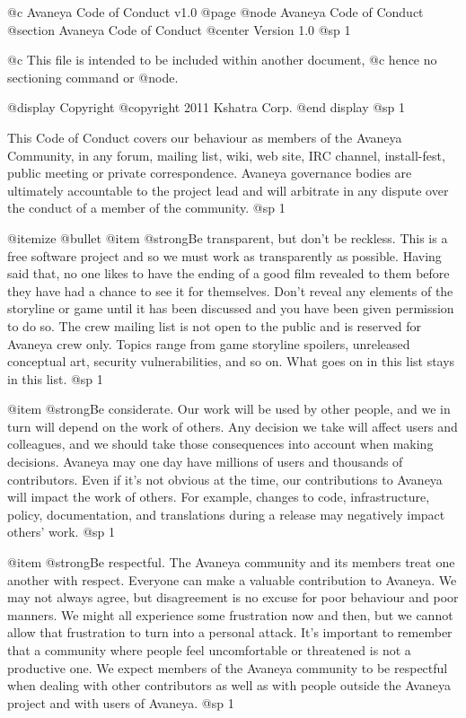 @c Avaneya Code of Conduct v1.0
@page
@node Avaneya Code of Conduct
@section Avaneya Code of Conduct
@center Version 1.0
@sp 1

@c This file is intended to be included within another document,
@c hence no sectioning command or @node.

@display
Copyright @copyright{} 2011 Kshatra Corp.
@end display
@sp 1

This Code of Conduct covers our behaviour as members of the Avaneya
Community, in any forum, mailing list, wiki, web site, IRC channel,
install-fest, public meeting or private correspondence. Avaneya
governance bodies are ultimately accountable to the project lead and
will arbitrate in any dispute over the conduct of a member of the
community.
@sp 1

@itemize @bullet
@item
@strong{Be transparent, but don't be reckless.} This is a free
software project and so we must work as transparently as possible.
Having said that, no one likes to have the ending of a good film
revealed to them before they have had a chance to see it for
themselves. Don't reveal any elements of the storyline or game until
it has been discussed and you have been given permission to do so. The
crew mailing list is not open to the public and is reserved for
Avaneya crew only. Topics range from game storyline spoilers,
unreleased conceptual art, security vulnerabilities, and so on. What
goes on in this list stays in this list.
@sp 1

@item
@strong{Be considerate.} Our work will be used by other people, and we
in turn will depend on the work of others. Any decision we take will
affect users and colleagues, and we should take those consequences
into account when making decisions. Avaneya may one day have millions
of users and thousands of contributors. Even if it's not obvious at
the time, our contributions to Avaneya will impact the work of others.
For example, changes to code, infrastructure, policy, documentation,
and translations during a release may negatively impact others' work.
@sp 1

@item
@strong{Be respectful.} The Avaneya community and its members treat one
another with respect. Everyone can make a valuable contribution to
Avaneya. We may not always agree, but disagreement is no excuse for
poor behaviour and poor manners. We might all experience some
frustration now and then, but we cannot allow that frustration to turn
into a personal attack. It's important to remember that a community
where people feel uncomfortable or threatened is not a productive one.
We expect members of the Avaneya community to be respectful when
dealing with other contributors as well as with people outside the
Avaneya project and with users of Avaneya.
@sp 1

